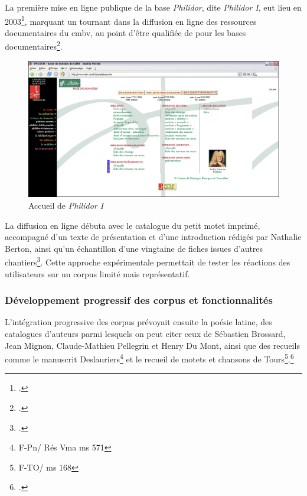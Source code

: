 La première mise en ligne publique de la base \textit{Philidor}, dite \textit{Philidor I}, eut lieu en 2003\footcite[Présentation de la base de données PHILIDOR en Octobre 2010]{michelbenoitDocumentationTechniqueBibliographique1997}, marquant un tournant dans la diffusion en ligne des ressources documentaires du \gls{cmbv}, au point d'être qualifiée de  pour les bases documentaires\footcite[Rapport sur le projet Philidor de Jérémie Crublet, juin 2006]{michelbenoitDocumentationTechniqueBibliographique1997}.

\begin{figure}[h]
	\caption{Accueil de \textit{Philidor I}} \label{philidor_i}
	\centering
	\includegraphics[width=\textwidth]{images/philidor1.png}
\end{figure}

La diffusion en ligne débuta avec le catalogue du petit motet imprimé, accompagné d'un texte de présentation et d'une introduction rédigés par Nathalie Berton, ainsi qu'un échantillon d'une vingtaine de fiches issues d'autres chantiers\footcite[Conseil scientifique, bilan de l'année 2001]{michelbenoitDocumentationTechniqueBibliographique1997}. Cette approche expérimentale permettait de tester les réactions des utilisateurs sur un corpus limité mais représentatif.

\subsubsection{Développement progressif des corpus et fonctionnalités}

L'intégration progressive des corpus prévoyait ensuite la poésie latine, des catalogues d'auteurs parmi lesquels on peut citer ceux de Sébastien Brossard, Jean Mignon, Claude-Mathieu Pellegrin et Henry Du Mont, ainsi que des recueils comme le manuscrit Deslauriers\footnote{F-Pn/ Rés Vma ms 571} et le recueil de motets et chansons de Tours\footnote{F-TO/ ms 168}.\footcite[Conseil scientifique, bilan de l'année 2001]{michelbenoitDocumentationTechniqueBibliographique1997}

